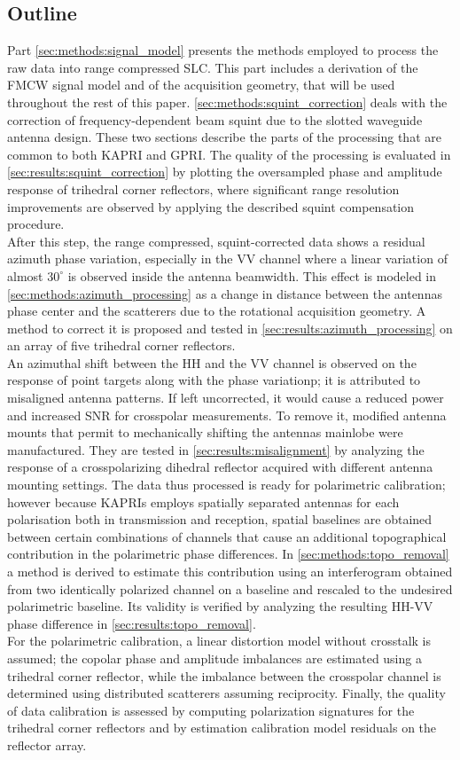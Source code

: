 \subsection{Outline}
Part \ref{sec:methods:signal_model} presents  the methods employed to process the raw data into range compressed SLC. This part includes a derivation of the FMCW signal model and of the acquisition geometry, that will be used throughout the rest of this paper. \autoref{sec:methods:squint_correction} deals with the correction of frequency-dependent beam squint due to the slotted waveguide antenna design. These two sections describe the parts of the processing that are common to both KAPRI and GPRI. The quality of the processing is evaluated in \autoref{sec:results:squint_correction} by plotting the oversampled phase and amplitude response of trihedral corner reflectors, where significant range resolution improvements are observed by applying the described squint compensation procedure.\\
After this step, the range compressed, squint-corrected data shows a residual azimuth phase variation, especially in the VV channel where a linear variation of almost $30^\circ$ is observed inside the antenna beamwidth. This effect is modeled in \autoref{sec:methods:azimuth_processing} as a change in distance between the antennas phase center and the scatterers due to the rotational acquisition geometry. A method to correct it is proposed and tested in \autoref{sec:results:azimuth_processing} on an array of five trihedral corner reflectors.\\ An azimuthal shift between the HH and the VV channel is observed on the  response of point targets along with the phase variationp; it is attributed to misaligned antenna patterns. If left uncorrected, it would cause a reduced power and increased SNR for crosspolar measurements. To remove it, modified antenna mounts that permit to mechanically shifting the antennas mainlobe were manufactured. They are tested in \autoref{sec:results:misalignment} by analyzing the response of a crosspolarizing dihedral reflector acquired with different antenna mounting settings.
The data thus processed is ready for polarimetric calibration; however because KAPRIs employs spatially separated antennas for each polarisation both in transmission and reception, spatial baselines are obtained between certain combinations of channels that cause an additional topographical contribution in the polarimetric phase differences. In \autoref{sec:methods:topo_removal} a method is derived to estimate this contribution using an interferogram obtained from two identically polarized channel on a baseline and rescaled to the undesired polarimetric baseline. Its validity is verified by analyzing the resulting HH-VV phase difference in \autoref{sec:results:topo_removal}.\\
For the polarimetric calibration, a linear distortion model without crosstalk is assumed; the copolar phase and amplitude imbalances are estimated using a trihedral corner reflector, while the imbalance between the crosspolar channel is determined using distributed scatterers assuming reciprocity. Finally, the quality of data calibration is assessed by computing polarization signatures for the trihedral corner reflectors and by estimation calibration model residuals on the reflector array. 